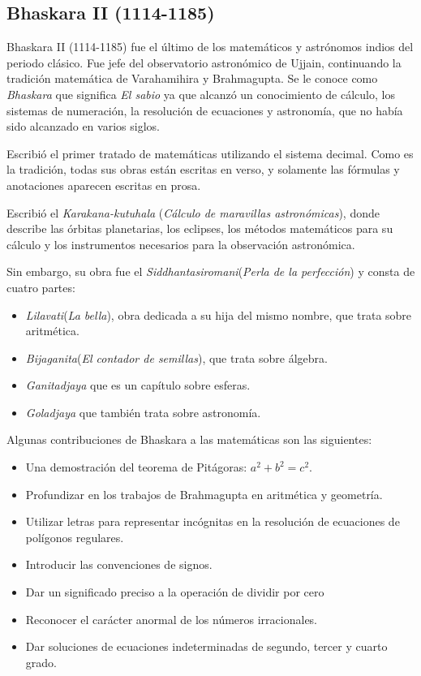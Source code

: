 \documentclass[a4paper, 11pt]{article}
\begin{document}
	\subsection{Bhaskara II (1114-1185)}
		Bhaskara II (1114-1185) fue el último de los matemáticos y astrónomos indios del periodo clásico. Fue jefe del
		observatorio astronómico de Ujjain, continuando la tradición matemática de Varahamihira y Brahmagupta. Se le
		conoce como \textit{Bhaskara} que significa \textit{El sabio} ya que alcanzó un conocimiento de cálculo, los
		sistemas de numeración, la resolución de ecuaciones y astronomía, que no había sido alcanzado en varios siglos.
		
		Escribió el primer tratado de matemáticas utilizando el sistema decimal. Como es la tradición, todas sus obras
		están escritas en verso, y solamente las fórmulas y anotaciones aparecen escritas en prosa.
		
		Escribió el \textit{Karakana-kutuhala} (\textit{Cálculo de maravillas astronómicas}), donde describe las órbitas
		planetarias, los eclipses, los métodos matemáticos para su cálculo y los instrumentos necesarios para la
		observación astronómica.
		
		Sin embargo, su obra fue el \textit{Siddhantasiromani}(\textit{Perla de la perfección}) y consta de cuatro partes:
		\begin{itemize}
			\item \textit{Lilavati}(\textit{La bella}), obra dedicada a su hija del mismo nombre, que trata sobre aritmética.
			\item \textit{Bijaganita}(\textit{El contador de semillas}), que trata sobre álgebra.
			\item \textit{Ganitadjaya} que es un capítulo sobre esferas.
			\item \textit{Goladjaya} que también trata sobre astronomía.
		\end{itemize}
		
		Algunas contribuciones de Bhaskara a las matemáticas son las siguientes:
		\begin{itemize}
			\item Una demostración del teorema de Pitágoras: $a^{2}+b^{2}=c^{2}$.
			\item Profundizar en los trabajos de Brahmagupta en aritmética y geometría.
			\item Utilizar letras para representar incógnitas en la resolución de ecuaciones de polígonos regulares.
			\item Introducir las convenciones de signos.
			\item Dar un significado preciso a la operación de dividir por cero
			\item Reconocer el carácter anormal de los números irracionales.
			\item Dar soluciones de ecuaciones indeterminadas de segundo, tercer y cuarto grado.
		\end{itemize}
		
\end{document}
